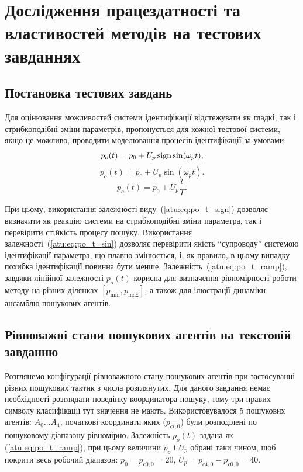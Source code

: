 

\section{Дослідження працездатності та властивостей методів на тестових завданнях} %

\subsection{Постановка тестових завдань}

Для оцінювання можливостей системи ідентифікації відстежувати як гладкі, так і
стрибкоподібні зміни параметрів, пропонується для кожної тестової системи, якщо
це можливо, проводити моделювання процесів ідентифікації за умовами:
%
\begin{equation}
  p_o(t) = p_0 +  U_{p} \operatorname*{sign} \sin( \omega_{p} t ),
  \label{atu:eq:po_t_sign}
\end{equation}
%
%
\begin{equation}
  p_o(t) = p_0 +  U_{p} \sin( \omega_{p} t ).
  \label{atu:eq:po_t_sin}
\end{equation}
%
\begin{equation}
  p_o(t) = p_0 +  U_{p} \frac{t}{T}.
  \label{atu:eq:po_t_ramp}
\end{equation}


При цьому, використання залежності виду~(\ref{atu:eq:po_t_sign}) дозволяє
визначити як реакцію системи на стрибкоподібні зміни параметра,
так і перевірити стійкість процесу пошуку. Використання
залежності~(\ref{atu:eq:po_t_sin}) дозволяє перевірити якість ``супроводу''
системою ідентифікації параметра, що плавно змінюється, і, як
правило, в цьому випадку похибка ідентифікації повинна бути
менше. Залежність~(\ref{atu:eq:po_t_ramp}), завдяки лінійної залежності
$ p_o (t) $ корисна для визначення рівномірності роботи методу на
різних ділянках
$ [p_{\min}, p_{\max}] $, а також для ілюстрації динаміки ансамблю
пошукових агентів.



\subsection{Рівноважні стани пошукових агентів на текстовій завданню} %

Розглянемо конфігурації рівноважного стану пошукових агентів при застосуванні
різних пошукових тактик з числа розглянутих. Для даного завдання немає
необхідності розглядати поведінку координатора пошуку, тому три правих символу
класифікації тут значення не мають.
Використовувалося 5 пошукових агентів: $A_0 \ldots A_4$, початкові
координати яких ($p_{ci,0}$) були розподілені по пошуковому діапазону
рівномірно. Залежність $p_o (t)$ задана як (\ref{atu:eq:po_t_ramp}), при
цьому величини $p_o$ і $U_p$ обрані таки чином, щоб покрити весь робочий
діапазон: $p_0 = p_{c0,0} = 20$, $U_p = p_{c4,0} - p_{c0,0} = 40$.


